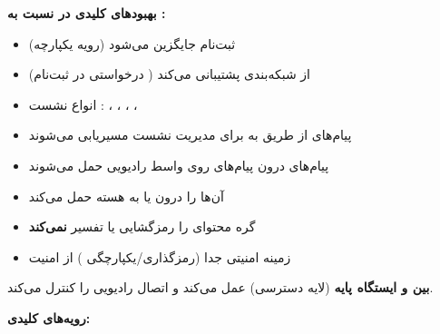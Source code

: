 \textbf{بهبودهای کلیدی  در  نسبت به :}

\begin{itemize}
\tightlist
\item
  ثبت‌نام جایگزین  می‌شود (رویه یکپارچه)
\item
  از شبکه‌بندی پشتیبانی می‌کند ( درخواستی در ثبت‌نام)
\item
  انواع نشست : ، ، ، ، 
\item
  پیام‌های  از طریق  به  برای مدیریت نشست مسیریابی می‌شوند
\end{itemize}




\begin{itemize}
\tightlist
\item
  پیام‌های  درون پیام‌های  روی واسط رادیویی حمل می‌شوند
\item
   آن‌ها را درون  یا  به هسته حمل می‌کند
\item
  گره  محتوای  را رمزگشایی یا تفسیر \textbf{نمی‌کند}
\item
  زمینه امنیتی  جدا (رمزگذاری/\allowbreak{}یکپارچگی ) از امنیت 
\end{itemize}



 \textbf{بین  و ایستگاه پایه} (لایه دسترسی) عمل می‌کند و اتصال رادیویی را کنترل می‌کند.


\textbf{رویه‌های کلیدی:}


